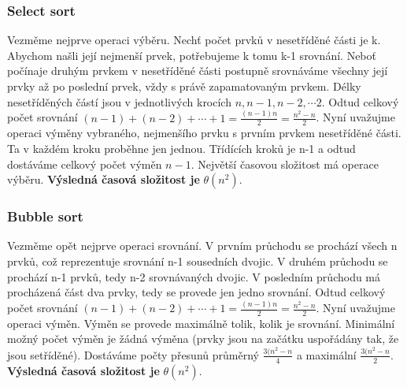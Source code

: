 \documentclass[10pt,a4paper]{article}
\begin{document}
\subsubsection{Select sort}
Vezměme nejprve operaci výběru. Nechť počet prvků v nesetříděné části je k. Abychom našli její nejmenší prvek, potřebujeme k tomu k-1 srovnání. Neboť počínaje druhým prvkem v nesetříděné části postupně srovnáváme všechny její prvky až po poslední prvek, vždy s právě zapamatovaným prvkem. Délky nesetříděných částí jsou v jednotlivých krocích $n, n-1, n-2, \cdots 2$. Odtud celkový počet srovnání $(n-1) + (n-2) + \cdots + 1 = \frac{(n-1)n}{2} = \frac{n^2-n}{2}$. Nyní uvažujme operaci výměny vybraného, nejmenšího prvku s prvním prvkem nesetříděné části. Ta v každém kroku proběhne jen jednou. Třídících kroků je n-1 a odtud dostáváme celkový počet výměn $n-1$. Největší časovou složitost má operace výběru. \textbf{Výsledná časová složitost je} $\theta (n^2)$.

\subsubsection{Bubble sort}
Vezměme opět nejprve operaci srovnání. V prvním průchodu se prochází všech n prvků, což reprezentuje srovnání n-1 sousedních dvojic. V druhém průchodu se prochází n-1 prvků, tedy n-2 srovnávaných dvojic. V posledním průchodu má procházená část dva prvky, tedy se provede jen jedno srovnání. Odtud celkový počet srovnání $(n-1) + (n-2) + \cdots + 1 = \frac{(n-1)n}{2} = \frac{n^2-n}{2}$. Nyní uvažujme operaci výměn. Výměn se provede maximálně tolik, kolik je srovnání. Minimální možný počet výměn je žádná výměna (prvky jsou na začátku uspořádány tak, že jsou setříděné). Dostáváme počty přesunů průměrný $\frac{3(n^2-n}{4}$ a maximální $\frac{3(n^2-n}{2}$. \textbf{Výsledná časová složitost je} $\theta (n^2)$.
\end{document}
